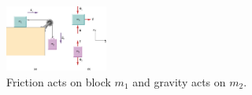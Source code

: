 \documentclass{article}
\begin{document}
\begin{figure}
\centering
\includegraphics[width=0.3\textwidth]{figures/blocks.jpg}
\caption{\label{fig:3} Friction acts on block $m_1$ and gravity acts on $m_2$.}
\end{figure}
\end{document}
